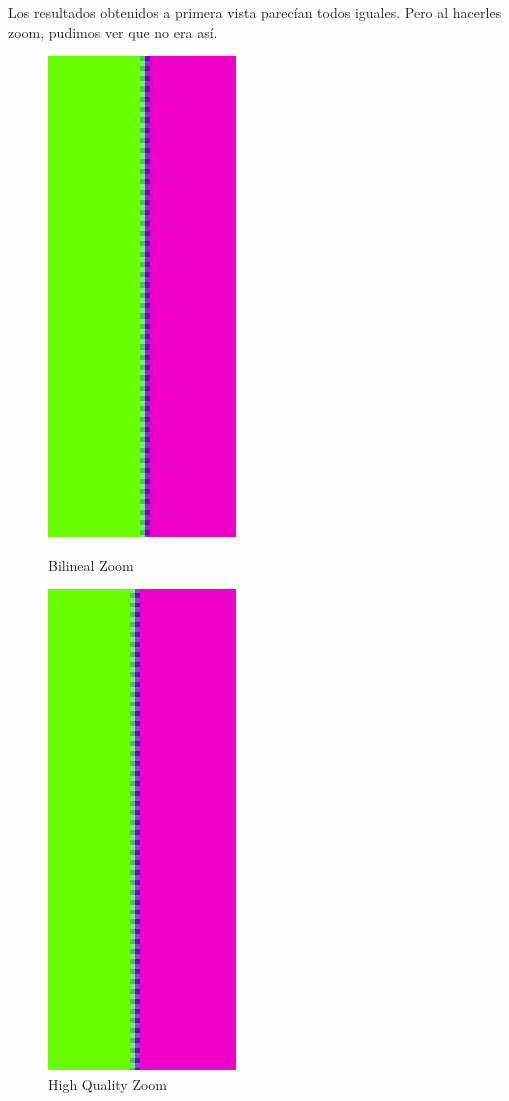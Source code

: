Los resultados obtenidos a primera vista parecían todos iguales. Pero al hacerles zoom, pudimos ver que no era así.
\begin{figure}[!htb]
\begin{center}
    \includegraphics[scale=0.6]{imagenes/colores_bilineal_zoom.jpg}
    \caption{Bilineal Zoom}
        \end{center}
\endminipage
{}
\begin{center}
    \includegraphics[scale=0.6]{imagenes/colores_hq_zoom.jpg}
    \caption{High Quality Zoom}
        \end{center}
\endminipage 
\end{figure}
